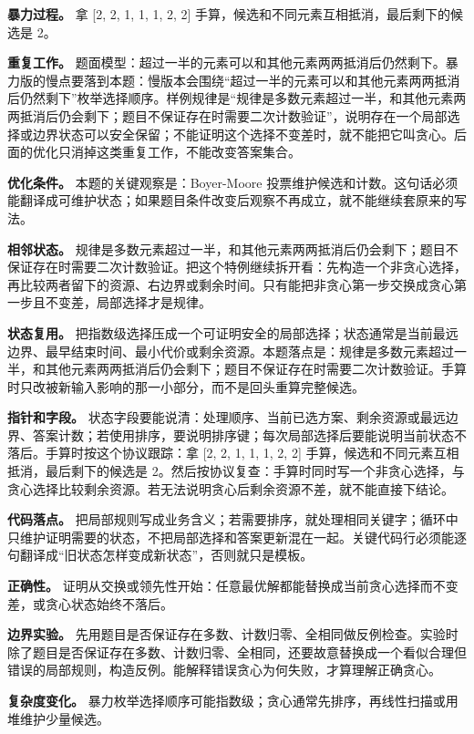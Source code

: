 \textbf{暴力过程。} 拿 [2, 2, 1, 1, 1, 2, 2] 手算，候选和不同元素互相抵消，最后剩下的候选是 2。

\textbf{重复工作。} 题面模型：超过一半的元素可以和其他元素两两抵消后仍然剩下。暴力版的慢点要落到本题：慢版本会围绕“超过一半的元素可以和其他元素两两抵消后仍然剩下”枚举选择顺序。样例规律是“规律是多数元素超过一半，和其他元素两两抵消后仍会剩下；题目不保证存在时需要二次计数验证”，说明存在一个局部选择或边界状态可以安全保留；不能证明这个选择不变差时，就不能把它叫贪心。后面的优化只消掉这类重复工作，不能改变答案集合。

\textbf{优化条件。} 本题的关键观察是：Boyer-Moore 投票维护候选和计数。这句话必须能翻译成可维护状态；如果题目条件改变后观察不再成立，就不能继续套原来的写法。

\textbf{相邻状态。} 规律是多数元素超过一半，和其他元素两两抵消后仍会剩下；题目不保证存在时需要二次计数验证。把这个特例继续拆开看：先构造一个非贪心选择，再比较两者留下的资源、右边界或剩余时间。只有能把非贪心第一步交换成贪心第一步且不变差，局部选择才是规律。

\textbf{状态复用。} 把指数级选择压成一个可证明安全的局部选择；状态通常是当前最远边界、最早结束时间、最小代价或剩余资源。本题落点是：规律是多数元素超过一半，和其他元素两两抵消后仍会剩下；题目不保证存在时需要二次计数验证。手算时只改被新输入影响的那一小部分，而不是回头重算完整候选。

\textbf{指针和字段。} 状态字段要能说清：处理顺序、当前已选方案、剩余资源或最远边界、答案计数；若使用排序，要说明排序键；每次局部选择后要能说明当前状态不落后。手算时按这个协议跟踪：拿 [2, 2, 1, 1, 1, 2, 2] 手算，候选和不同元素互相抵消，最后剩下的候选是 2。然后按协议复查：手算时同时写一个非贪心选择，与贪心选择比较剩余资源。若无法说明贪心后剩余资源不差，就不能直接下结论。

\textbf{代码落点。} 把局部规则写成业务含义；若需要排序，就处理相同关键字；循环中只维护证明需要的状态，不把局部选择和答案更新混在一起。关键代码行必须能逐句翻译成“旧状态怎样变成新状态”，否则就只是模板。

\textbf{正确性。} 证明从交换或领先性开始：任意最优解都能替换成当前贪心选择而不变差，或贪心状态始终不落后。

\textbf{边界实验。} 先用题目是否保证存在多数、计数归零、全相同做反例检查。实验时除了题目是否保证存在多数、计数归零、全相同，还要故意替换成一个看似合理但错误的局部规则，构造反例。能解释错误贪心为何失败，才算理解正确贪心。

\textbf{复杂度变化。} 暴力枚举选择顺序可能指数级；贪心通常先排序，再线性扫描或用堆维护少量候选。

